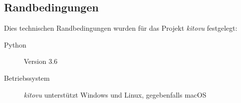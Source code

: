 \documentclass[a4paper]{article}
\begin{document}
\subsection{Randbedingungen}

Dies technischen Randbedingungen wurden für das Projekt \emph{kitovu} festgelegt:

\begin{description}
  \item[Python] Version 3.6
  \item[Betriebssystem] \emph{kitovu} unterstützt Windows und Linux, gegebenfalls macOS
\end{description}
\end{document}
